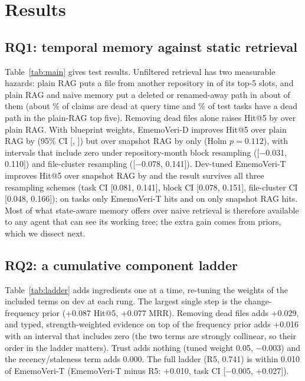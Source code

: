 \documentclass[runningheads]{llncs}
\newcommand{\sys}{EmemoVeri}
\begin{document}
\section{Results}
\subsection{RQ1: temporal memory against static retrieval}
Table~\ref{tab:main} gives test results. Unfiltered retrieval has two measurable hazards: plain RAG puts a file from another repository in \contamPlain{} of its top-5 slots, and plain RAG and naive memory put a deleted or renamed-away path in about \deadPlain{} of them (about \deadShare{}\% of claims are dead at query time and \plainDeadTasks{}\% of test tasks have a dead path in the plain-RAG top five). Removing dead files alone raises Hit@5 by \dSnapPlainFive{} over plain RAG. With blueprint weights, \sys{}-D improves Hit@5 over plain RAG by \dEmvPlainFive{} (95\% CI [\dEmvPlainLo{}, \dEmvPlainHi{}]) but over snapshot RAG by only \dEmvSnapFive{} (Holm $p=0.112$), with intervals that include zero under repository-month block resampling ([$-$0.031, 0.110]) and file-cluster resampling ([$-$0.078, 0.141]). Dev-tuned \sys{}-T improves Hit@5 over snapshot RAG by \dTunedSnapFive{} and the result survives all three resampling schemes (task CI [0.081, 0.141], block CI [0.078, 0.151], file-cluster CI [0.048, 0.166]); on \tunedOnly{} tasks only \sys{}-T hits and on \snapOnly{} only snapshot RAG hits. Most of what state-aware memory offers over naive retrieval is therefore available to any agent that can see its working tree; the extra gain comes from priors, which we dissect next.

\begin{table}[t]\centering\small
\resizebox{\linewidth}{!}{}
\caption{Test results ($n=\nTest{}$).}
\label{tab:main}
\end{table}

\subsection{RQ2: a cumulative component ladder}
\label{sec:ladder}
Table~\ref{tab:ladder} adds ingredients one at a time, re-tuning the weights of the included terms on dev at each rung. The largest single step is the change-frequency prior (+0.087 Hit@5, +0.077 MRR). Removing dead files adds +0.029, and typed, strength-weighted evidence on top of the frequency prior adds +0.016 with an interval that includes zero (the two terms are strongly collinear, so their order in the ladder matters). Trust adds nothing (tuned weight 0.05, $-$0.003) and the recency/staleness term adds 0.000. The full ladder (R5, 0.741) is within 0.010 of \sys{}-T (\sys{}-T minus R5: +0.010, task CI [$-$0.005, +0.027]).
\end{document}

